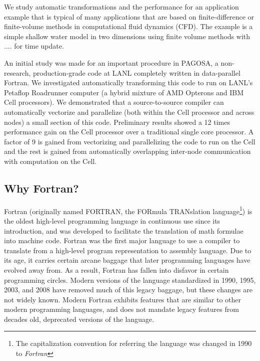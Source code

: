 We study automatic transformations and the performance for an
application example that is typical of many applications that are based on
finite-difference or finite-volume methods in computational fluid dynamics
(CFD).  The example is a simple shallow water model in two dimensions using
finite volume methods with .... for time update.

An initial study was made for an important procedure in PAGOSA, a
non-research, production-grade code at LANL completely written in
data-parallel Fortran.  We investigated automatically transforming
this code to run on LANL's Petaflop Roadrunner computer (a hybrid
mixture of AMD Opterons and IBM Cell processors).  We demonstrated that a
source-to-source compiler can automatically vectorize and parallelize
(both within the Cell processor and across nodes) a small section of
this code.  Preliminary results showed a 12 times performance gain on
the Cell processor over a traditional single core processor.  A factor
of 9 is gained from vectorizing and parallelizing the code to run on
the Cell and the rest is gained from automatically overlapping
inter-node communication with computation on the Cell.



\subsection{Why Fortran?}

Fortran (originally named FORTRAN, the FORmula TRANslation
language\footnote{The capitalization convention for referring the
  language was changed in 1990 to \emph{Fortran}}) is the oldest
high-level programming language in continuous use since its
introduction, and was developed to facilitate the translation of math
formulae into machine code. Fortran was the first major language to
use a compiler to translate from a high-level program representation
to assembly language. Due to its age, it carries certain arcane
baggage that later programming languages have evolved away from. As a
result, Fortran has fallen into disfavor in certain programming
circles.  Modern versions of the language standardized in 1990, 1995, 2003, and 2008
have removed much of this legacy baggage, but these changes are not
widely known.  Modern Fortran exhibits features that are similar to 
other modern programming languages, and does not mandate legacy features
from decades old, deprecated versions of the language.

